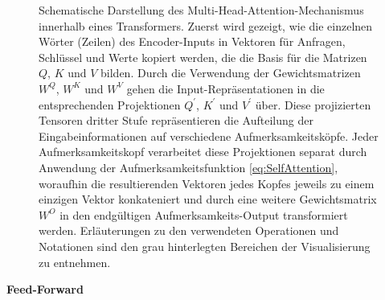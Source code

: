 \begin{landscape}
\begin{figure}
	\centering
	
	\caption{Schematische Darstellung des Multi-Head-Attention-Mechanismus innerhalb eines Transformers. Zuerst wird gezeigt, wie die einzelnen Wörter (Zeilen) des Encoder-Inputs in Vektoren für Anfragen, Schlüssel und Werte kopiert werden, die die Basis für die Matrizen $Q$, $K$ und $V$ bilden. Durch die Verwendung der Gewichtsmatrizen $W^Q$, $W^K$ und $W^V$ gehen die Input-Repräsentationen in die entsprechenden Projektionen $Q^\prime$, $K^\prime$ und $V^\prime$ über. Diese projizierten Tensoren dritter Stufe repräsentieren die Aufteilung der Eingabeinformationen auf verschiedene Aufmerksamkeitsköpfe. Jeder Aufmerksamkeitskopf verarbeitet diese Projektionen separat durch Anwendung der Aufmerksamkeitsfunktion \ref{eq:SelfAttention}, woraufhin die resultierenden Vektoren jedes Kopfes jeweils zu einem einzigen Vektor konkateniert und durch eine weitere Gewichtsmatrix $W^O$ in den endgültigen Aufmerksamkeits-Output transformiert werden. Erläuterungen zu den verwendeten Operationen und Notationen sind den grau hinterlegten Bereichen der Visualisierung zu entnehmen.}
	\label{Abb:MultiheadAttention}
\end{figure}
\end{landscape}



\textbf{Feed-Forward}

